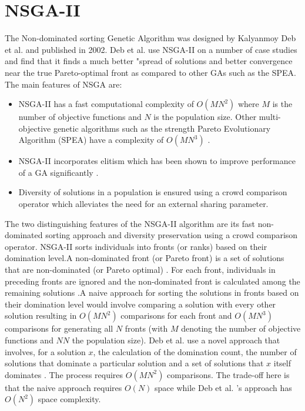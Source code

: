 \section{NSGA-II} \label{sec:nsga}
The Non-dominated sorting Genetic Algorithm was designed by Kalyanmoy Deb et al. and published in 2002. Deb et al. use NSGA-II on a number of case studies and find that it finds a much better "spread of solutions and better convergence near the true Pareto-optimal front as compared to other GAs such as the SPEA. The main features of NSGA are: 
\begin{itemize}
\item[] NSGA-II has a fast computational complexity of $O(MN^2)$ where $M$ is the number of objective functions and $N$ is the population size. Other multi-objective genetic algorithms such as the strength Pareto Evolutionary Algorithm (SPEA) have a complexity of $O(MN^3)$ \cite{Deb2002}.
\item[] NSGA-II incorporates elitism which has been shown to improve performance of a GA significantly \cite{Deb2002}.
\item[] Diversity of solutions in a population is ensured using a crowd comparison operator which alleviates the need for an external sharing parameter.
\end{itemize}
  The two distinguishing features of the NSGA-II algorithm are its fast non-dominated sorting approach and diversity preservation using a crowd comparison operator. NSGA-II sorts individuals into fronts (or ranks) based on their domination level.A non-dominated front (or Pareto front) is a set of solutions that are non-dominated (or Pareto optimal) \cite{Deb2002}. For each front, individuals in preceding fronts are ignored and the non-dominated front is calculated among the remaining solutions \cite{Deb2002}.A naive approach for sorting the solutions in fronts based on their domination level would involve comparing a solution with every other solution resulting in $O(MN^2)$ comparisons for each front and $O(MN^3)$ comparisons for generating all $N$ fronts (with $M$ denoting the number of objective functions and $NN$ the population size). Deb et al. use a novel approach that involves, for a solution $x$, the calculation of the domination count, the number of solutions that dominate a particular solution and a set of solutions that $x$ itself dominates \cite{Deb2002}. The process requires $O(MN^2)$ comparisons. The trade-off here is that the naive approach requires $O(N)$ space while Deb et al. 's approach has $O(N^2)$ space complexity.
  
